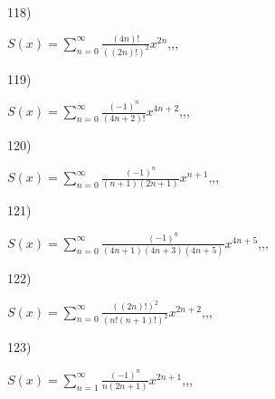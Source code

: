 \documentclass[11pt, ukrainian]{article}
\begin{document}
\par
\vspace{0.9cm}
118) \space 
{%
{$S(x)=\sum\limits_{n=0}^{\infty}{\frac{(4n)!}{{((2n)!)^2}}}{x^{{2n}}}$},,, \par \smallskip  
}
\par
\vspace{0.9cm}
119) \space 
{%
{$S(x)=\sum\limits_{n=0}^{\infty}{\frac{(-1)^n}{(4n+2)!}}{x^{{4n+2}}}$},,, \par \smallskip  
}
\par
\vspace{0.9cm}
120) \space 
{%
{$S(x)=\sum\limits_{n=0}^{\infty}{\frac{(-1)^n}{(n+1)(2n+1)}}{x^{{n+1}}}$},,, \par \smallskip  
}
\par
\newpage
121) \space 
{%
{$S(x)=\sum\limits_{n=0}^{\infty}{\frac{(-1)^n}{(4n+1)(4n+3)(4n+5)}}{x^{{4n+5}}}$},,, \par \smallskip  
}
\par
\vspace{0.9cm}
122) \space 
{%
{$S(x)=\sum\limits_{n=0}^{\infty}{\frac{((2n)!)^2}{(n!(n+1)!)^2}}{x^{{2n+2}}}$},,, \par \smallskip  
}
\par
\vspace{0.9cm}
123) \space 
{%
{$S(x)=\sum\limits_{n=1}^{\infty}{\frac{(-1)^n}{n(2n+1)}}{x^{{2n+1}}}$},,, \par \smallskip  
}
\end{document}
